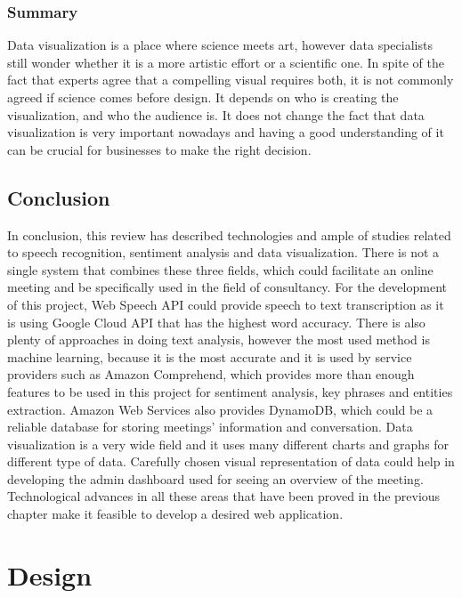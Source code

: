 \documentclass{article}
\begin{document}
\subsubsection{Summary}
{\large
Data visualization is a place where science meets art, however data specialists still wonder whether it is a more artistic effort or a scientific one. In spite of the fact that experts agree that a compelling visual requires both, it is not commonly agreed if science comes before design. It depends on who is creating the visualization, and who the audience is. It does not change the fact that data visualization is very important nowadays and having a good understanding of it can be crucial for businesses to make the right decision.\par
}

\newpage
\subsection{Conclusion}
{\large 
In conclusion, this review has described technologies and ample of studies related to speech recognition, sentiment analysis and data visualization. There is not a single system that combines these three fields, which could facilitate an online meeting and be specifically used in the field of consultancy. For the development of this project, Web Speech API could provide speech to text transcription as it is using Google Cloud API that has the highest word accuracy. There is also plenty of approaches in doing text analysis, however the most used method is machine learning, because it is the most accurate and it is used by service providers such as Amazon Comprehend, which provides more than enough features to be used in this project for sentiment analysis, key phrases and entities extraction. Amazon Web Services also provides DynamoDB, which could be a reliable database for storing meetings' information and conversation. Data visualization is a very wide field and it uses many different charts and graphs for different type of data. Carefully chosen visual representation of data could help in developing the admin dashboard used for seeing an overview of the meeting. Technological advances in all these areas that have been proved in the previous chapter make it feasible to develop a desired web application.\par
}

\newpage

\section{Design}
\end{document}
